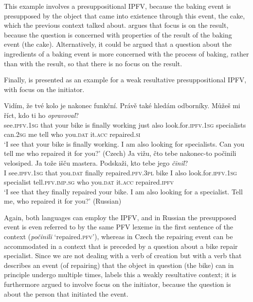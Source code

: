\documentclass[output=paper,colorlinks,citecolor=brown]{langscibook}
\begin{document}
\noindent This example involves a presuppositional IPFV, because the baking event is presupposed by the object that came into existence through this event, the cake, which the previous context talked about. \citeauthor{klimek22} argues that focus is on the result, because the question is concerned with properties of the result of the baking event (the cake). Alternatively, it could be argued that a question about the ingredients of a baking event is more concerned with the process of baking, rather than with the result, so that there is no focus on the result. 

Finally,  \citep[adapted from][19%
]{klimek22} is presented as an example for a weak resultative presuppositional IPFV, with focus on the initiator. 

\ea\label{ex:wrpfi}
\ea
\gll Vidím, že tvé kolo je nakonec funkční. Právě také hledám odborníky. Můžeš mi říct, kdo ti ho \textit{opravoval}?\\
    see.\textsc{ipfv.1sg} that your bike is finally working just also look.for.\textsc{ipfv.1sg} specialists can.\textsc{2sg} me tell who you.\textsc{dat} it.\textsc{acc} repaired.\textsc{si}\\
\glt `I see that your bike is finally working. I am also looking for specialists. Can you tell me who repaired it for you?' \hfill (Czech)\label{ex:wrpfia}
\ex
\gll Ja vižu, čto tebe nakonec-to počinili velosiped. Ja tože išču mastera. Podskaži, kto tebe jego \textit{činil}?\\ 
    I see.\textsc{ipfv.1sg} that you.\textsc{dat} finally repaired.\textsc{pfv.3pl} bike I also look.for.\textsc{ipfv.1sg} specialist tell.\textsc{pfv.imp.sg} who you.\textsc{dat} it.\textsc{acc} repaired.\textsc{ipfv}\\
\glt `I see that they finally repaired your bike. I am also looking for a specialist. Tell me, who repaired it for you?' \hfill (Russian)
\z 
\z 

\noindent Again, both languages can employ the IPFV, and in Russian the presupposed event is even referred to by the same PFV lexeme in the first sentence of the context (\textit{počinili} `repaired.\textsc{pfv}'), whereas in Czech the repairing event can be accommodated in a context that is preceded by a question about a bike repair specialist. Since we are not dealing with a verb of creation but with a verb that describes an event (of repairing) that the object in question (the bike) can in principle undergo multiple times, \citeauthor{klimek22} labels this a weakly resultative context; it is furthermore argued to involve focus on the initiator, because the question is about the person that initiated the event.  
\end{document}
